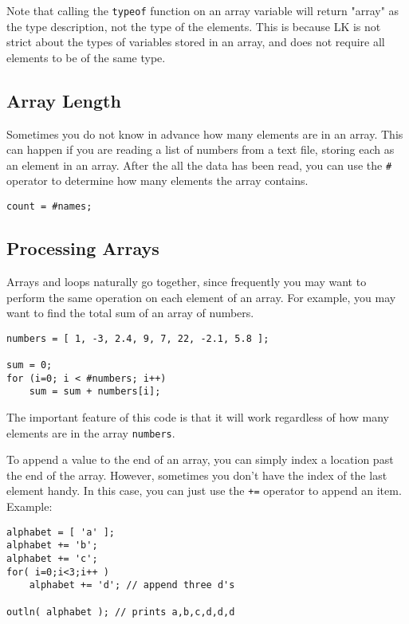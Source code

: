 \documentclass{article}
\begin{document}
Note that calling the \texttt{typeof} function on an array variable will return "array" as the type description, not the type of the elements.  This is because LK is not strict about the types of variables stored in an array, and does not require all elements to be of the same type.

\subsection{Array Length}

Sometimes you do not know in advance how many elements are in an array.  This can happen if you are reading a list of numbers from a text file, storing each as an element in an array.  After the all the data has been read, you can use the \texttt{\#} operator to determine how many elements the array contains.

\begin{verbatim}
count = #names;
\end{verbatim}

\subsection{Processing Arrays}

Arrays and loops naturally go together, since frequently you may want to perform the same operation on each element of an array.  For example, you may want to find the total sum of an array of numbers.

\begin{verbatim}
numbers = [ 1, -3, 2.4, 9, 7, 22, -2.1, 5.8 ];

sum = 0;
for (i=0; i < #numbers; i++)
    sum = sum + numbers[i];
\end{verbatim}

The important feature of this code is that it will work regardless of how many elements are in the array \texttt{numbers}.

To append a value to the end of an array, you can simply index a location past the end of the array.  However, sometimes you don't have the index of the last element handy.  In this case, you can just use the \texttt{+=} operator to append an item.  Example:

\begin{verbatim}
alphabet = [ 'a' ];
alphabet += 'b';
alphabet += 'c';
for( i=0;i<3;i++ )
    alphabet += 'd'; // append three d's
    
outln( alphabet ); // prints a,b,c,d,d,d
\end{verbatim}
\end{document}
